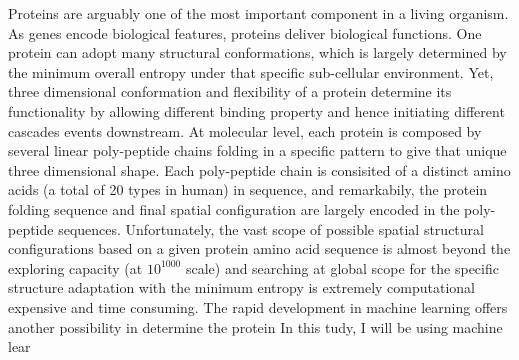 Proteins are arguably one of the most important component in a living organism. As genes encode biological features, proteins deliver biological functions. One protein can adopt many structural conformations, which is largely determined by the minimum overall entropy under that specific sub-cellular environment. Yet, three dimensional conformation and flexibility of a protein determine its functionality by allowing different binding property and hence initiating different cascades events downstream. At molecular level, each protein is composed by several linear poly-peptide chains folding in a specific pattern to give that unique three dimensional shape. Each poly-peptide chain is consisited of a distinct amino acids (a total of 20 types in human) in sequence, and remarkabily, the protein folding sequence and final spatial configuration are largely encoded in the poly-peptide sequences. Unfortunately, the vast scope of possible spatial structural configurations based on a given protein amino acid sequence is almost beyond the exploring capacity (at $10^{1000}$ scale) and searching at global scope for the specific structure adaptation with the minimum entropy is extremely computational expensive and time consuming. The rapid development in machine learning offers another possibility in determine the protein  In this tudy, I will be using machine lear